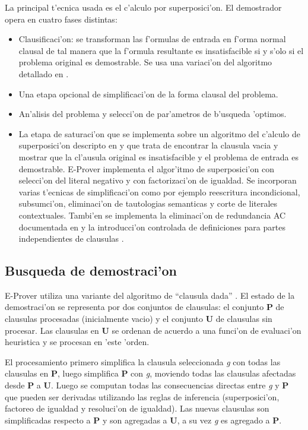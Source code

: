 La principal t'ecnica usada es el c'alculo por superposici'on. El demostrador opera en cuatro fases distintas:
\begin{itemize}
\item Clausificaci'on: se transforman las f'ormulas de entrada en f'orma normal clausal de tal manera que la f'ormula resultante es insatisfacible si y s'olo si el problema original es demostrable. Se usa una variaci'on del algoritmo detallado en \cite{smallcnf2001}.

\item Una etapa opcional de simplificaci'on de la forma clausal del problema.

\item An'alisis del problema y selecci'on de par'ametros de b'usqueda 'optimos.

\item La etapa de saturaci'on que se implementa sobre un algoritmo del c'alculo de superposici'on descripto en \cite{bg94} y \cite{aicom2002} que trata de encontrar la clausula vacia y mostrar que la cl'ausula original es insatisfacible y el problema de entrada es demostrable. E-Prover implementa el algor'itmo de superposici'on con selecci'on del literal negativo y con factorizaci'on de igualdad. Se incorporan varias t'ecnicas de simplificaci'on como por ejemplo reescritura incondicional, subsumci'on, eliminaci'on de tautologias semanticas y corte de literales contextuales. Tambi'en se implementa la eliminaci'on de redundancia AC documentada en \cite{jsc2003} y la introducci'on controlada de definiciones para partes independientes de clausulas \cite{ijcai2001}.
\end{itemize}

\subsection{Busqueda de demostraci'on}

E-Prover utiliza una variante del algoritmo de ``clausula dada'' \cite{dk97}. El estado de la demostraci'on se representa por dos conjuntos de clausulas: el conjunto \textbf{P} de clausulas procesadas (inicialmente vacio) y el conjunto \textbf{U} de clausulas sin procesar. Las clausulas en \textbf{U} se ordenan de acuerdo a una funci'on de evaluaci'on heuristica y se procesan en 'este 'orden.

El procesamiento primero simplifica la clausula seleccionada \textit{g} con todas las clausulas en \textbf{P}, luego simplifica \textbf{P} con \textit{g}, moviendo todas las clausulas afectadas desde \textbf{P} a \textbf{U}. Luego se computan todas las consecuencias directas entre \textit{g} y \textbf{P} que pueden ser derivadas utilizando las reglas de inferencia (superposici'on, factoreo de igualdad y resoluci'on de igualdad). Las nuevas clausulas son simplificadas respecto a \textbf{P} y son agregadas a \textbf{U}, a su vez \textit{g} es agregado a \textbf{P}.

